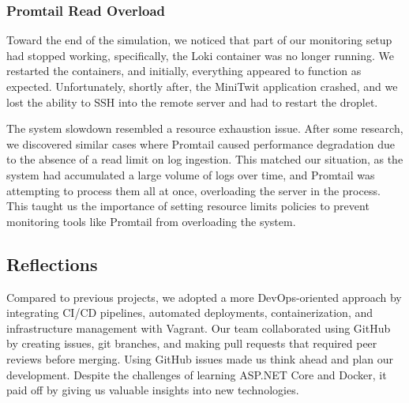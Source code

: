 \documentclass[12pt,a4paper,reqno]{report}
\begin{document}
\subsubsection{Promtail Read Overload}
Toward the end of the simulation, we noticed that part of our monitoring setup had stopped working, specifically, the Loki container was no longer running. We restarted the containers, and initially, everything appeared to function as expected. Unfortunately, shortly after, the MiniTwit application crashed, and we lost the ability to SSH into the remote server and had to restart the droplet.


The system slowdown resembled a resource exhaustion issue. After some research, we discovered similar cases where Promtail caused performance degradation due to the absence of a read limit on log ingestion. This matched our situation, as the system had accumulated a large volume of logs over time, and Promtail was attempting to process them all at once, overloading the server in the process. This taught us the importance of setting resource limits policies to prevent monitoring tools like Promtail from overloading the system.

\subsection{Reflections}

Compared to previous projects, we adopted a more DevOps-oriented approach by integrating CI/CD pipelines, automated deployments, containerization, and infrastructure management with Vagrant. Our team collaborated using GitHub by creating issues, git branches, and making pull requests that required peer reviews before merging. Using GitHub issues made us think ahead and plan our development. Despite the challenges of learning ASP.NET Core and Docker, it paid off by giving us valuable insights into new technologies.


\printbibliography[heading=none]
\end{document}
